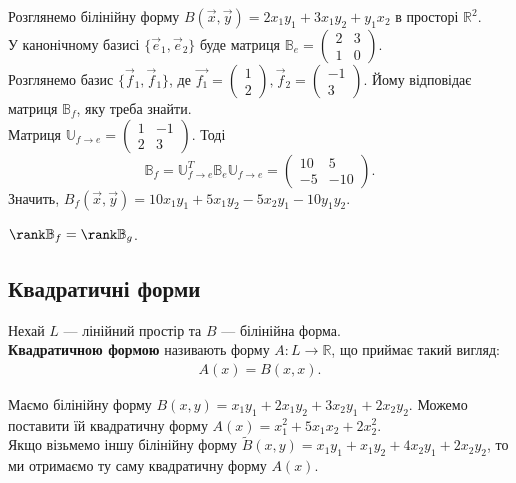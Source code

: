 \documentclass{math_library}
\begin{document}
\begin{example}
Розглянемо білінійну форму $B(\vec{x},\vec{y}) = 2x_1y_1 + 3x_1y_2 + y_1x_2$ в просторі $\mathbb{R}^2$.\\
У канонічному базисі $\{\vec{e}_1,\vec{e}_2\}$ буде матриця $\mathbb{B}_e = \begin{pmatrix}
2 & 3 \\
1 & 0
\end{pmatrix}$.\\
Розглянемо базис $\{ \vec{f}_1, \vec{f}_1 \}$, де $\vec{f_1} = \begin{pmatrix}
1 \\ 2
\end{pmatrix}, \vec{f}_2 = \begin{pmatrix}
-1 \\ 3
\end{pmatrix}$. Йому відповідає матриця $\mathbb{B}_f$, яку треба знайти.\\
Матриця $\mathbb{U}_{f \to e} = \begin{pmatrix}
1 & -1 \\
2 & 3
\end{pmatrix}$. Тоді
\[
\mathbb{B}_f = \mathbb{U}^T_{f \to e} \mathbb{B}_e \mathbb{U}_{f \to e} = \begin{pmatrix}
10 & 5 \\
-5 & -10
\end{pmatrix}.
\]
Значить, $B_f(\vec{x},\vec{y}) = 10x_1y_1 + 5x_1y_2 - 5x_2y_1 - 10y_1y_2$.
\end{example}

\begin{corollary}
$\rank \mathbb{B}_f = \rank \mathbb{B}_g$.
\end{corollary}

\subsection{Квадратичні форми}
\begin{definition}
Нехай $L$ --- лінійний простір та $B$ --- білінійна форма.\\
\textbf{Квадратичною формою} називають форму $A \colon L \to \mathbb{R}$, що приймає такий вигляд:
\begin{align*}
A(x) = B(x,x).
\end{align*}
\end{definition}

\begin{example}
Маємо білінійну форму $B(x,y) = x_1y_1 + 2x_1y_2 + 3x_2y_1 + 2x_2y_2$. Можемо поставити їй квадратичну форму $A(x) = x_1^2 + 5x_1x_2 + 2x_2^2$.\\
Якщо візьмемо іншу білінійну форму $\widetilde{B}(x,y) = x_1y_1 + x_1y_2 + 4x_2y_1 + 2x_2y_2$, то ми отримаємо ту саму квадратичну форму $A(x)$.
\end{example}
\end{document}
